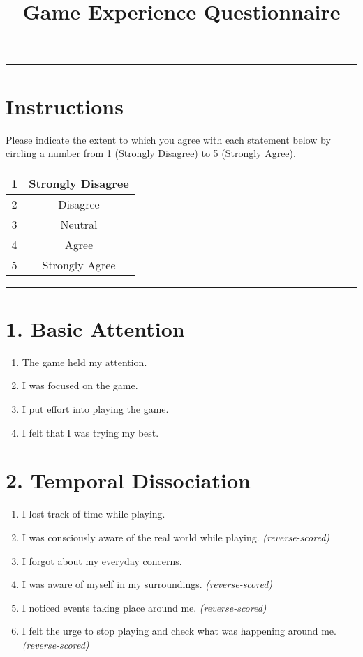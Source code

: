 \documentclass[12pt]{article}
\title{\textbf{Game Experience Questionnaire}}
\author{}
\date{}
\begin{document}
\maketitle
\hrule
\vspace{0.5cm}

\section*{Instructions}
Please indicate the extent to which you agree with each statement below by circling a number from 1 (Strongly Disagree) to 5 (Strongly Agree).

\vspace{0.5cm}

\begin{center}
\begin{tabular}{|c|c|}
\hline
1 & Strongly Disagree \\
\hline
2 & Disagree \\
\hline
3 & Neutral \\
\hline
4 & Agree \\
\hline
5 & Strongly Agree \\
\hline
\end{tabular}
\end{center}

\vspace{0.5cm}
\hrule
\vspace{0.5cm}

\section*{1. Basic Attention}

\begin{enumerate}[label=\arabic*.]
  \item The game held my attention.
  \item I was focused on the game.
  \item I put effort into playing the game.
  \item I felt that I was trying my best.
\end{enumerate}

\section*{2. Temporal Dissociation}

\begin{enumerate}[resume]
  \item I lost track of time while playing.
  \item I was consciously aware of the real world while playing. \textit{(reverse-scored)}
  \item I forgot about my everyday concerns.
  \item I was aware of myself in my surroundings. \textit{(reverse-scored)}
  \item I noticed events taking place around me. \textit{(reverse-scored)}
  \item I felt the urge to stop playing and check what was happening around me. \textit{(reverse-scored)}
\end{enumerate}
\end{document}
